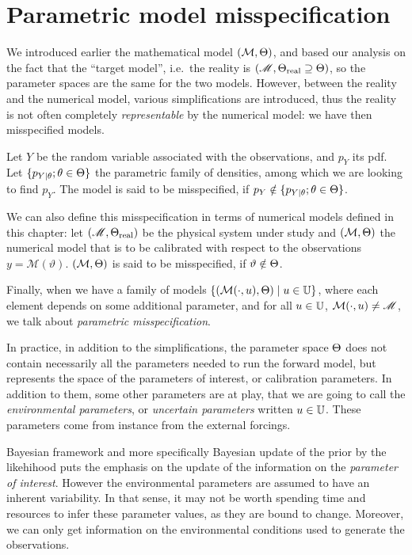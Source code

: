 \documentclass[../../Main_ManuscritThese.tex]{subfiles}
\begin{document}
\section{Parametric model misspecification}
\label{sec:model_misspecification}
We introduced earlier the mathematical model $(\mathcal{M},\Theta)$, and based our analysis on the fact that the ``target model'', i.e.\ the reality is $(\mathscr{M},\Theta_{\mathrm{real}} \supseteq \Theta)$, so the parameter spaces are the same for the two models. However, between the reality and the numerical model, various simplifications are introduced, thus the reality is not often completely \emph{representable} by the numerical model: we have then misspecified models.

\begin{definition}
  Let $Y$ be the random variable associated with the observations, and
  $p_Y$ its pdf. Let $\{p_{Y \mid \theta} ; \theta \in \Theta\}$ the
  parametric family of densities, among which we are looking to find
  $p_Y$. The model is said to be misspecified, if
  $p_Y \notin \{p_{Y \mid \theta} ; \theta \in \Theta\}$.

  We can also define this misspecification in terms of numerical
  models defined in this chapter: let
  $(\mathscr{M},\Theta_{\mathrm{real}})$ be the physical system under
  study and $(\mathcal{M},\Theta)$ the numerical model that is to be
  calibrated with respect to the observations
  $y=\mathscr{M}(\vartheta)$. $(\mathcal{M}, \Theta)$ is said to be
  misspecified, if $\vartheta \notin \Theta$.

  Finally, when we have a family of models
  $\{(\mathcal{M}(\cdot, u),\Theta) \mid u \in\mathbb{U}\}$, where
  each element depends on some additional parameter, and for all
  $u\in \mathbb{U}$, $\mathcal{M}(\cdot,u) \neq \mathscr{M}$, we talk
  about \emph{parametric misspecification}.
\end{definition}

In practice, in addition to the simplifications, the parameter space
$\Theta$ does not contain necessarily all the parameters needed to run
the forward model, but represents the space of the parameters of
interest, or calibration parameters. In addition to them, some other
parameters are at play, that we are going to call the
\emph{environmental parameters}, or \emph{uncertain parameters}
written $u\in \mathbb{U}$. These parameters come from instance from the
external forcings.



Bayesian framework and more specifically Bayesian update of the prior
by the likehihood puts the emphasis on the update of the information
on the \emph{parameter of interest}. However the environmental
parameters are assumed to have an inherent variability. In that sense,
it may not be worth spending time and resources to infer these
parameter values, as they are bound to change.  Moreover, we can only
get information on the environmental conditions used to generate the
observations.
\end{document}
